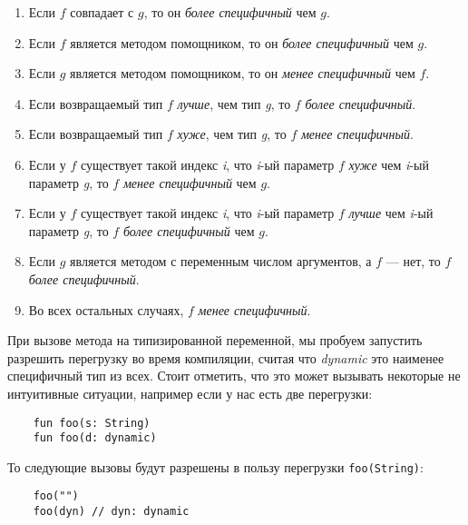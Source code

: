 \begin{enumerate}
    \item Если $f$ совпадает с $g$, то он \textit{более специфичный} чем $g$.
    \item Если $f$ является методом помощником, то он \textit{более специфичный} чем $g$.
    \item Если $g$ является методом помощником, то он \textit{менее специфичный} чем $f$.
    \item Если возвращаемый тип $f$ \textit{лучше}, чем тип \textit{g}, то $f$ \textit{более специфичный}.
    \item Если возвращаемый тип $f$ \textit{хуже}, чем тип \textit{g}, то $f$ \textit{менее специфичный}.
    \item Если у $f$ существует такой индекс \textit{i}, что \textit{i}-ый параметр $f$ \textit{хуже} чем \textit{i}-ый параметр \textit{g}, то $f$ \textit{менее специфичный} чем $g$.
    \item Если у $f$ существует такой индекс \textit{i}, что \textit{i}-ый параметр $f$ \textit{лучше} чем \textit{i}-ый параметр \textit{g}, то $f$ \textit{более специфичный} чем $g$.
    \item Если $g$ является методом с переменным числом аргументов, а $f$ --- нет, то $f$ \textit{более специфичный}.
    \item Во всех остальных случаях, $f$ \textit{менее специфичный}.
\end{enumerate}

При вызове метода на типизированной переменной, мы пробуем запустить разрешить перегрузку во время компиляции, считая что \textit{dynamic} это наименее специфичный тип из всех. Стоит отметить, что это может вызывать некоторые не интуитивные ситуации, например если у нас есть две перегрузки:

\begin{verbatim}
    fun foo(s: String)
    fun foo(d: dynamic)
\end{verbatim} 

То следующие вызовы будут разрешены в пользу перегрузки \texttt{foo(String)}:

\begin{verbatim}
    foo("")
    foo(dyn) // dyn: dynamic
\end{verbatim} 


